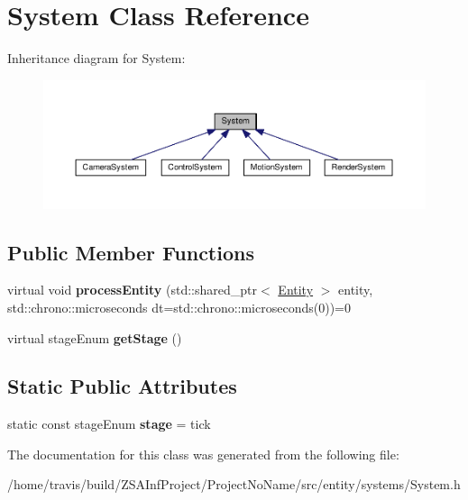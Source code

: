 \hypertarget{classSystem}{\section{System Class Reference}
\label{classSystem}
}


Inheritance diagram for System\-:
\nopagebreak
\begin{figure}[H]
\begin{center}
\leavevmode
\includegraphics[width=350pt]{classSystem__inherit__graph}
\end{center}
\end{figure}
\subsection*{Public Member Functions}
\begin{DoxyCompactItemize}
\item 
\hypertarget{classSystem_a3ed896251d22e5580c267419d8bb4c9e}{virtual void {\bfseries process\-Entity} (std\-::shared\-\_\-ptr$<$ \hyperlink{classEntity}{Entity} $>$ entity, std\-::chrono\-::microseconds dt=std\-::chrono\-::microseconds(0))=0}\label{classSystem_a3ed896251d22e5580c267419d8bb4c9e}

\item 
\hypertarget{classSystem_ab782585da2f3ed3a825c174135a97195}{virtual stage\-Enum {\bfseries get\-Stage} ()}\label{classSystem_ab782585da2f3ed3a825c174135a97195}

\end{DoxyCompactItemize}
\subsection*{Static Public Attributes}
\begin{DoxyCompactItemize}
\item 
\hypertarget{classSystem_a618e37d801f081801de4541a81f9d2b8}{static const stage\-Enum {\bfseries stage} = tick}\label{classSystem_a618e37d801f081801de4541a81f9d2b8}

\end{DoxyCompactItemize}


The documentation for this class was generated from the following file\-:\begin{DoxyCompactItemize}
\item 
/home/travis/build/\-Z\-S\-A\-Inf\-Project/\-Project\-No\-Name/src/entity/systems/System.\-h\end{DoxyCompactItemize}
